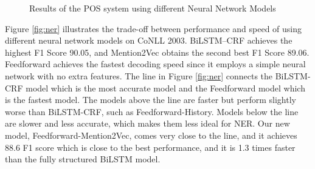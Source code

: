 \begin{figure}
 \caption{Results of the POS system using different Neural Network Models}
  \label{fig:pos}
\end{figure}

Figure \ref{fig:ner} illustrates the trade-off between performance and speed of using different neural network models on CoNLL 2003. BiLSTM--CRF achieves the highest F1 Score 90.05, and Mention2Vec obtains the second best F1 Score 89.06. Feedforward achieves the fastest decoding speed since it employs a simple neural network with no extra features. The line in Figure \ref{fig:ner} connects the BiLSTM-CRF model which is the most accurate model and the Feedforward model which is the fastest model. The models above the line are faster but perform slightly worse than BiLSTM-CRF, such as Feedforward-History. Models below the line are slower and less accurate, which makes them less ideal for NER. Our new model, Feedforward-Mention2Vec, comes very close to the line, and it achieves 88.6 F1 score which is close to the best performance, and it is 1.3 times faster than the fully structured BiLSTM model.

